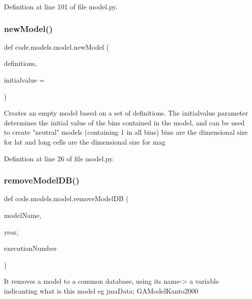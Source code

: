 Definition at line 101 of file model.\+py.

\mbox{\label{namespacecode_1_1models_1_1model_ad4cd9f5c3ee9cb21283e98f1dcd9d81b}} 
\subsubsection{\texorpdfstring{new\+Model()}{newModel()}}
{\footnotesize\ttfamily def code.\+models.\+model.\+new\+Model (\begin{DoxyParamCaption}\item[{}]{definitions,  }\item[{}]{initialvalue = {} }\end{DoxyParamCaption})}

\begin{DoxyVerb}Creates an empty model based on a set of definitions. 
The initialvalue parameter determines the initial value of 
the bins contained in the model, and can be used to create 
"neutral" models (containing 1 in all bins)
bins are the dimensional size for lat and long
cells are the dimensional size for mag
\end{DoxyVerb}
 

Definition at line 26 of file model.\+py.

\mbox{\label{namespacecode_1_1models_1_1model_af176247b55143d08b3c6ea471845f330}} 
\subsubsection{\texorpdfstring{remove\+Model\+D\+B()}{removeModelDB()}}
{\footnotesize\ttfamily def code.\+models.\+model.\+remove\+Model\+DB (\begin{DoxyParamCaption}\item[{}]{model\+Name,  }\item[{}]{year,  }\item[{}]{execution\+Number }\end{DoxyParamCaption})}

\begin{DoxyVerb}It removes a model to a common database, using its name-> a variable indicanting what is this model
eg jmaData; GAModelKanto2000
\end{DoxyVerb}
 

